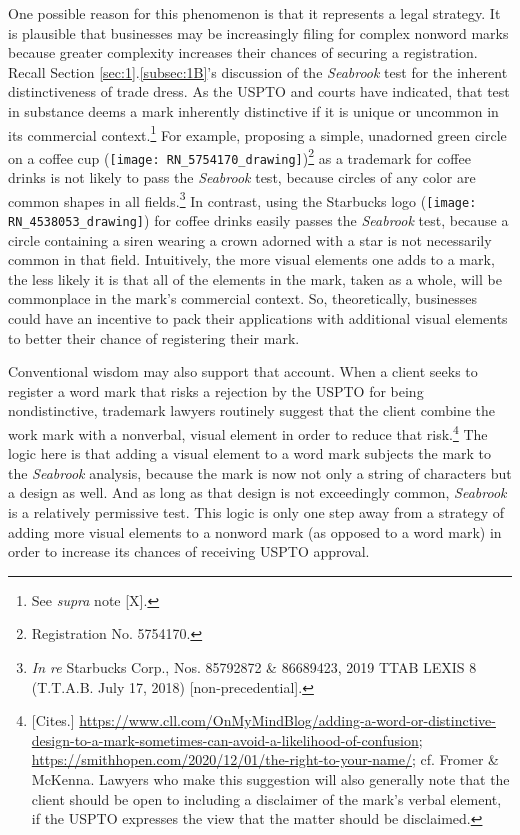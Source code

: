\documentclass[letterpaper, 11pt, oneside]{article}
\begin{document}
One possible reason for this phenomenon is that it represents a legal strategy. It is plausible that businesses may be increasingly filing for complex nonword marks because greater complexity increases their chances of securing a registration. Recall Section \ref{sec:1}.\ref{subsec:1B}'s discussion of the \textit{Seabrook} test for the inherent distinctiveness of trade dress. As the USPTO and courts have indicated, that test in substance deems a mark inherently distinctive if it is unique or uncommon in its commercial context.\footnote{See \textit{supra} note [X].} For example, proposing a simple, unadorned green circle on a coffee cup (\texttt{[image: RN\_5754170\_drawing]})\footnote{Registration No. 5754170.} as a trademark for coffee drinks is not likely to pass the \textit{Seabrook} test, because circles of any color are common shapes in all fields.\footnote{\textit{In re} Starbucks Corp., Nos. 85792872 \& 86689423, 2019 TTAB LEXIS 8 (T.T.A.B. July 17, 2018) [non-precedential].} In contrast, using the Starbucks logo (\texttt{[image: RN\_4538053\_drawing]}) for coffee drinks easily passes the \textit{Seabrook} test, because a circle containing a siren wearing a crown adorned with a star is not necessarily common in that field. Intuitively, the more visual elements one adds to a mark, the less likely it is that all of the elements in the mark, taken as a whole, will be commonplace in the mark's commercial context. So, theoretically, businesses could have an incentive to pack their applications with additional visual elements to better their chance of registering their mark.

Conventional wisdom may also support that account. When a client seeks to register a word mark that risks a rejection by the USPTO for being nondistinctive, trademark lawyers routinely suggest that the client combine the work mark with a nonverbal, visual element in order to reduce that risk.\footnote{[Cites.] \url{https://www.cll.com/OnMyMindBlog/adding-a-word-or-distinctive-design-to-a-mark-sometimes-can-avoid-a-likelihood-of-confusion}; \url{https://smithhopen.com/2020/12/01/the-right-to-your-name/}; cf. Fromer \& McKenna. Lawyers who make this suggestion will also generally note that the client should be open to including a disclaimer of the mark's verbal element, if the USPTO expresses the view that the matter should be disclaimed.} The logic here is that adding a visual element to a word mark subjects the mark to the \textit{Seabrook} analysis, because the mark is now not only a string of characters but a design as well. And as long as that design is not exceedingly common, \textit{Seabrook} is a relatively permissive test. This logic is only one step away from a strategy of adding more visual elements to a nonword mark (as opposed to a word mark) in order to increase its chances of receiving USPTO approval.
\end{document}
